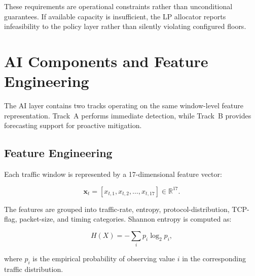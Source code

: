 \documentclass[12pt, a4paper, reqno, oneside]{book}
\begin{document}
These requirements are operational constraints rather than unconditional
guarantees. If available capacity is insufficient, the LP allocator reports
infeasibility to the policy layer rather than silently violating configured
floors.

\section{AI Components and Feature Engineering}
\label{sec:features}

The AI layer contains two tracks operating on the same window-level feature
representation. Track~A performs immediate detection, while Track~B provides
forecasting support for proactive mitigation.

\subsection{Feature Engineering}
\label{subsec:feature-engineering}

Each traffic window is represented by a 17-dimensional feature vector:

\[
    \mathbf{x}_t =
    [x_{t,1}, x_{t,2}, \ldots, x_{t,17}] \in \mathbb{R}^{17}.
\]

The features are grouped into traffic-rate, entropy, protocol-distribution,
TCP-flag, packet-size, and timing categories. Shannon entropy is computed as:

\[
    H(X) = -\sum_i p_i \log_2 p_i,
\]

where \(p_i\) is the empirical probability of observing value \(i\) in the
corresponding traffic distribution.
\end{document}
